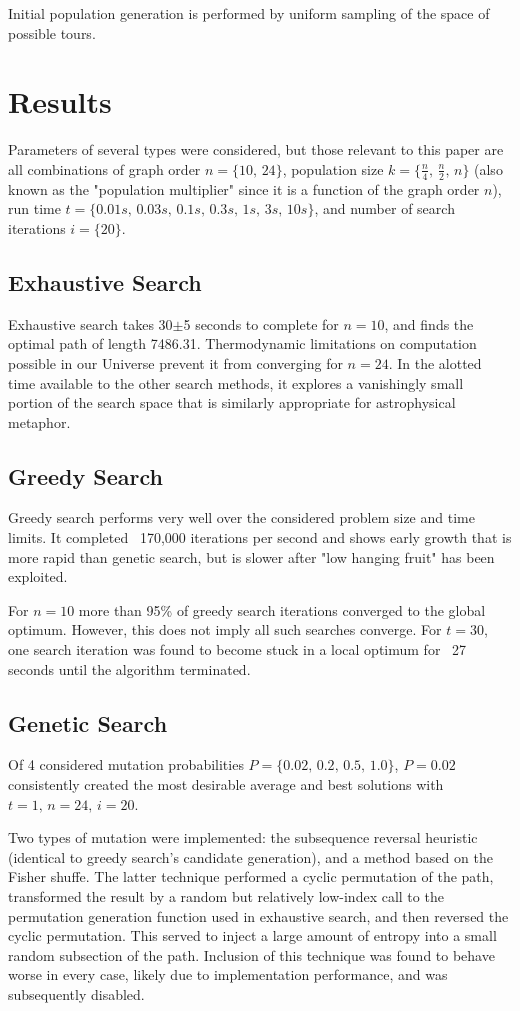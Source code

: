 \documentclass[10pt, conference, compsocconf]{IEEEtran}
\begin{document}
Initial population generation is performed by uniform sampling of the space of possible tours. 

\section{Results}
Parameters of several types were considered, but those relevant to this paper are all combinations of graph order $n=\{10,\,24\}$, population size $k=\{\frac{n}{4},\,\frac{n}{2},\,n\}$ (also known as the "population multiplier" since it is a function of the graph order $n$), run time $t=\{0.01s,\,0.03s,\,0.1s,\,0.3s,\,1s,\,3s,\,10s\}$, and number of search iterations $i=\{20\}$.

\subsection{Exhaustive Search}
Exhaustive search takes 30$\pm$5 seconds to complete for $n=10$, and finds the optimal path of length 7486.31. Thermodynamic limitations on computation possible in our Universe prevent it from converging for $n=24$. In the alotted time available to the other search methods, it explores a vanishingly small portion of the search space that is similarly appropriate for astrophysical metaphor. 

\subsection{Greedy Search}
Greedy search performs very well over the considered problem size and time limits. It completed ~170,000 iterations per second and shows early growth that is more rapid than genetic search, but is slower after "low hanging fruit" has been exploited.  

For $n=10$ more than 95\% of greedy search iterations converged to the global optimum. However, this does not imply all such searches converge. For $t=30$, one search iteration was found to become stuck in a local optimum for ~27 seconds until the algorithm terminated.

\subsection{Genetic Search}
Of 4 considered mutation probabilities $P=\{0.02,\,0.2,\,0.5,\,1.0\}$, $P=0.02$ consistently created the most desirable average and best solutions with $t=1,\,n=24,\,i=20$. 

Two types of mutation were implemented: the subsequence reversal heuristic (identical to greedy search's candidate generation), and a method based on the Fisher shuffe. The latter technique performed a cyclic permutation of the path, transformed the result by a random but relatively low-index call to the permutation generation function used in exhaustive search, and then reversed the cyclic permutation. This served to inject a large amount of entropy into a small random subsection of the path. Inclusion of this technique was found to behave worse in every case, likely due to implementation performance, and was subsequently disabled.
\end{document}

